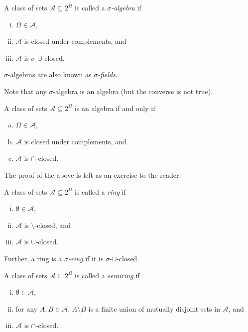 \begin{definition}
\label{defSigAlgebra}
    A class of sets $\mathcal{A}\subseteq 2^\Omega$ is called a \textit{$\sigma$-algebra} if
    \begin{enumerate}[(i)]
        \item $\Omega\in\mathcal{A}$,
        \item $\mathcal{A}$ is closed under complements, and
        \item $\mathcal{A}$ is $\sigma$-$\cup$-closed.
    \end{enumerate}
\end{definition}

$\sigma$-algebras are also known as \textit{$\sigma$-fields}.

Note that any $\sigma$-algebra is an algebra (but the converse is not true).

\begin{theorem}
\label{algebra iff conditions}
    A class of sets $\mathcal{A}\subseteq2^\Omega$ is an algebra if and only if
    \begin{enumerate}[(a)]
        \item $\Omega\in\mathcal{A}$,
        \item $\mathcal{A}$ is closed under complements, and
        \item $\mathcal{A}$ is $\cap$-closed.
    \end{enumerate}
\end{theorem}

The proof of the above is left as an exercise to the reader.

\begin{definition}[Ring]
\label{defRing}
    A class of sets $\mathcal{A}\subseteq2^\Omega$ is called a \textit{ring} if
    \begin{enumerate}[(i)]
        \item $\emptyset\in\mathcal{A}$,
        \item $\mathcal{A}$ is $\setminus$-closed, and
        \item $\mathcal{A}$ is $\cup$-closed.
    \end{enumerate}
\end{definition}

Further, a ring is a \textit{$\sigma$-ring} if it is $\sigma$-$\cup$-closed.

\begin{definition}[Semiring]
\label{defSemiring}
    A class of sets $\mathcal{A}\subseteq2^\Omega$ is called a \textit{semiring} if
    \begin{enumerate}[(i)]
        \item $\emptyset\in\mathcal{A}$, 
        \item for any $A,B\in\mathcal{A}$, $A\setminus B$ is a finite union of mutually disjoint sets in $\mathcal{A}$, and
        \item $\mathcal{A}$ is $\cap$-closed.
    \end{enumerate}
\end{definition}

